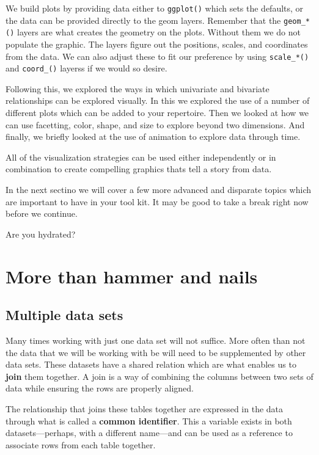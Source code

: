 \documentclass[
]{book}
\begin{document}
We build plots by providing data either to \texttt{ggplot()} which sets the defaults, or the data can be provided directly to the geom layers. Remember that the \texttt{geom\_*()} layers are what creates the geometry on the plots. Without them we do not populate the graphic. The layers figure out the positions, scales, and coordinates from the data. We can also adjust these to fit our preference by using \texttt{scale\_*()} and \texttt{coord\_()} layerss if we would so desire.

Following this, we explored the ways in which univariate and bivariate relationships can be explored visually. In this we explored the use of a number of different plots which can be added to your repertoire. Then we looked at how we can use facetting, color, shape, and size to explore beyond two dimensions. And finally, we briefly looked at the use of animation to explore data through time.

All of the visualization strategies can be used either independently or in combination to create compelling graphics thats tell a story from data.

In the next sectino we will cover a few more advanced and disparate topics which are important to have in your tool kit. It may be good to take a break right now before we continue.

Are you hydrated?

\hypertarget{part-more-than-hammer-and-nails}{%
\part{More than hammer and nails}\label{part-more-than-hammer-and-nails}}

\hypertarget{multiple-data-sets}{%
\chapter{Multiple data sets}\label{multiple-data-sets}}

Many times working with just one data set will not suffice. More often than not the data that we will be working with be will need to be supplemented by other data sets. These datasets have a shared relation which are what enables us to \textbf{join} them together. A join is a way of combining the columns between two sets of data while ensuring the rows are properly aligned.

The relationship that joins these tables together are expressed in the data through what is called a \textbf{common identifier}. This a variable exists in both datasets---perhaps, with a different name---and can be used as a reference to associate rows from each table together.
\end{document}

